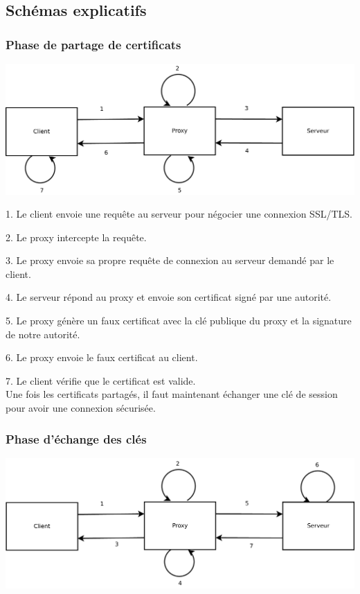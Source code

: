 \documentclass[a4paper,11pt,french]{article}
\begin{document}
\subsection{Schémas explicatifs}

\subsubsection{Phase de partage de certificats}

\begin{center}
\includegraphics[width=\textwidth]{images/Certificats.pdf}
\end{center}

1. Le client envoie une requête au serveur pour négocier une connexion SSL/TLS.

2. Le proxy intercepte la requête.

3. Le proxy envoie sa propre requête de connexion au serveur demandé par le client.

4. Le serveur répond au proxy et envoie son certificat signé par une autorité.

5. Le proxy génère un faux certificat avec la clé publique du proxy et la signature de notre autorité.

6. Le proxy envoie le faux certificat au client.

7. Le client vérifie que le certificat est valide.\\

Une fois les certificats partagés, il faut maintenant échanger une clé de session pour avoir une connexion sécurisée.

\subsubsection{Phase d'échange des clés}

\begin{center}
\includegraphics[width=\textwidth]{images/Cles.pdf}
\end{center}
\end{document}
